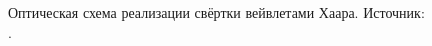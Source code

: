 \begin{figure}[htbp]
	\caption{Оптическая схема реализации свёртки вейвлетами Хаара. Источник: \cite{alkholidi2008real}.}
	\label{ris:JPEG2000}
\end{figure}
